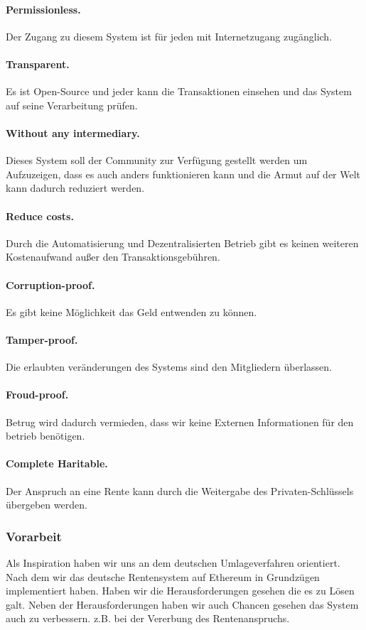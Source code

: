 \paragraph{Permissionless.} Der Zugang zu diesem System ist für jeden mit Internetzugang zugänglich.

\paragraph{Transparent.} Es ist Open-Source und jeder kann die Transaktionen einsehen und das System auf seine Verarbeitung prüfen.

\paragraph{Without any intermediary.} Dieses System soll der Community zur Verfügung gestellt werden um Aufzuzeigen, dass es auch anders funktionieren kann und die Armut auf der Welt kann dadurch reduziert werden.

\paragraph{Reduce costs.} Durch die Automatisierung und Dezentralisierten Betrieb gibt es keinen weiteren Kostenaufwand außer den Transaktionsgebühren.

\paragraph{Corruption-proof.} Es gibt keine Möglichkeit das Geld entwenden zu können.

\paragraph{Tamper-proof.} Die erlaubten veränderungen des Systems sind den Mitgliedern überlassen.

\paragraph{Froud-proof.}
Betrug wird dadurch vermieden, dass wir keine Externen Informationen für den betrieb benötigen. 

\paragraph{Complete Haritable.}
Der Anspruch an eine Rente kann durch die Weitergabe des Privaten-Schlüssels übergeben werden.


\subsubsection{Vorarbeit}

Als Inspiration haben wir uns an dem deutschen Umlageverfahren orientiert. Nach dem wir das deutsche Rentensystem auf Ethereum in Grundzügen implementiert haben. Haben wir die Herausforderungen gesehen die es zu Lösen galt.
Neben der Herausforderungen haben wir auch Chancen gesehen das System auch zu verbessern. z.B. bei der Vererbung des Rentenanspruchs.

